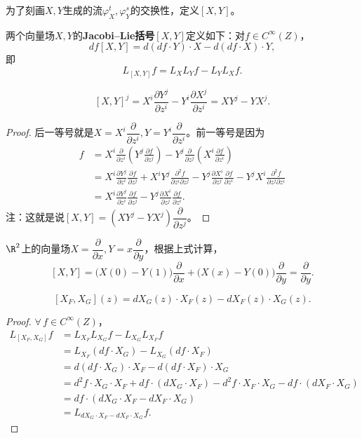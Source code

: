 为了刻画$X,Y$生成的流$\varphi_X^t,\varphi_Y^s$的交换性，定义$[X,Y]$。
\begin{definition}
    两个向量场$X,Y$的\textbf{Jacobi--Lie括号}$[X,Y]$定义如下：对$f\in C^\infty(Z)$，
    $$df[X,Y]=d(df\cdot Y)\cdot X-d(df\cdot X)\cdot Y,$$
    即
    $$L_{[X,Y]}f=L_XL_Yf-L_YL_Xf.$$
\end{definition}

\begin{proposition}
    $$[X,Y]^j=X^i\frac{\partial Y^j}{\partial z^i}
    -Y^i\frac{\partial X^j}{\partial z^i}=XY^j-YX^j.$$
\end{proposition}
\begin{proof}
    后一等号就是$X=X^i\dfrac{\partial}{\partial z^i},
    Y=Y^i\dfrac{\partial}{\partial z^i}$。前一等号是因为
    \begin{align*}
        [X,Y]f&=X^i\frac{\partial }{\partial z^i}
        \left(Y^j\frac{\partial f}{\partial z^j}\right)
        -Y^j\frac{\partial }{\partial z^j}
        \left(X^i\frac{\partial f}{\partial z^i}\right)\\
        &=X^i\frac{\partial Y^j}{\partial z^i}\frac{\partial f}{\partial z^j}
        +X^iY^j\frac{\partial^2f}{\partial z^i\partial z^j}
        -Y^j\frac{\partial X^i}{\partial z^j}\frac{\partial f}{\partial z^i}
        -Y^jX^i\frac{\partial^2f}{\partial z^j\partial z^i}\\
        &=X^i\frac{\partial Y^j}{\partial z^i}\frac{\partial f}{\partial z^j}
        -Y^j\frac{\partial X^i}{\partial z^j}\frac{\partial f}{\partial z^i}.
    \end{align*}
    注：这就是说$[X,Y]=(XY^j-YX^j)\dfrac{\partial}{\partial z^j}$。
\end{proof}
\begin{example}
    $\R^2$上的向量场$X=\dfrac{\partial}{\partial x},
    Y=x\dfrac{\partial}{\partial y}$，根据上式计算，
    $$[X,Y]=\big(X(0)-Y(1)\big)\dfrac{\partial}{\partial x}
    +\big(X(x)-Y(0)\big)\dfrac{\partial}{\partial y}
    =\dfrac{\partial}{\partial y}.$$
\end{example}

\begin{lemma}
    $$[X_F,X_G](z)=dX_G(z)\cdot X_F(z)-dX_F(z)\cdot X_G(z).$$
\end{lemma}
\begin{proof}
    $\forall\,f\in C^\infty(Z)$，
    \begin{align*}
        L_{[X_F,X_G]}f&=L_{X_F}L_{X_G}f-L_{X_G}L_{X_F}f\\
        &=L_{X_F}(df\cdot X_G)-L_{X_G}(df\cdot X_F)\\
        &=d(df\cdot X_G)\cdot X_F-d(df\cdot X_F)\cdot X_G\\
        &=d^2f\cdot X_G\cdot X_F+df\cdot(dX_G\cdot X_F)
        -d^2f\cdot X_F\cdot X_G-df\cdot(dX_F\cdot X_G)\\
        &=df\cdot(dX_G\cdot X_F-dX_F\cdot X_G)\\
        &=L_{dX_G\cdot X_F-dX_F\cdot X_G}f.
    \end{align*}
\end{proof}

